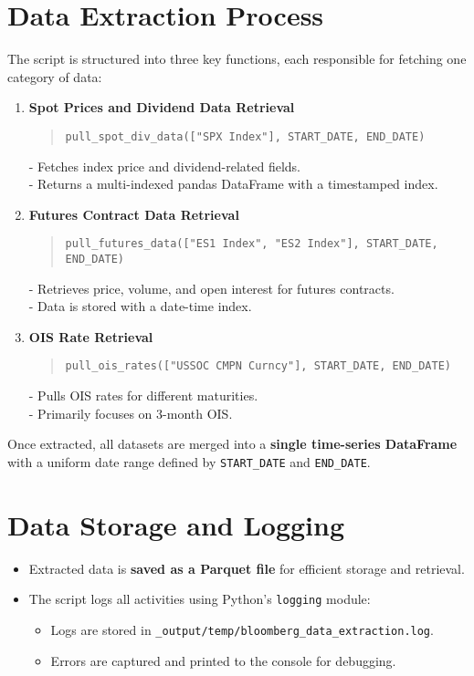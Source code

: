 \documentclass{article}
\begin{document}
\section{Data Extraction Process}
The script is structured into three key functions, each responsible for fetching one category of data:

\begin{enumerate}
  \item \textbf{Spot Prices and Dividend Data Retrieval}
  \begin{quote}
    \texttt{pull\_spot\_div\_data(["SPX Index"], START\_DATE, END\_DATE)}
  \end{quote}
  - Fetches index price and dividend-related fields.\\
  - Returns a multi-indexed pandas DataFrame with a timestamped index.

  \item \textbf{Futures Contract Data Retrieval}
  \begin{quote}
    \texttt{pull\_futures\_data(["ES1 Index", "ES2 Index"], START\_DATE, END\_DATE)}
  \end{quote}
  - Retrieves price, volume, and open interest for futures contracts.\\
  - Data is stored with a date-time index.

  \item \textbf{OIS Rate Retrieval}
  \begin{quote}
    \texttt{pull\_ois\_rates(["USSOC CMPN Curncy"], START\_DATE, END\_DATE)}
  \end{quote}
  - Pulls OIS rates for different maturities.\\
  - Primarily focuses on 3-month OIS.
\end{enumerate}

Once extracted, all datasets are merged into a \textbf{single time-series DataFrame} with a uniform date range defined by \texttt{START\_DATE} and \texttt{END\_DATE}.

\section{Data Storage and Logging}
\begin{itemize}
  \item Extracted data is \textbf{saved as a Parquet file} for efficient storage and retrieval.
  \item The script logs all activities using Python's \texttt{logging} module:
  \begin{itemize}
    \item Logs are stored in \texttt{\_output/temp/bloomberg\_data\_extraction.log}.
    \item Errors are captured and printed to the console for debugging.
  \end{itemize}
\end{itemize}
\end{document}
